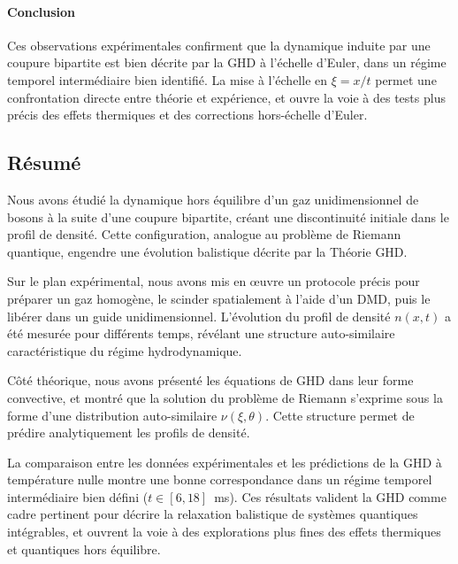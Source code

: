 {\color{blue}
\paragraph{Conclusion}

Ces observations expérimentales confirment que la dynamique induite par une coupure bipartite est bien décrite par la GHD à l’échelle d’Euler, dans un régime temporel intermédiaire bien identifié. La mise à l’échelle en $\xi=x/t$ permet une confrontation directe entre théorie et expérience, et ouvre la voie à des tests plus précis des effets thermiques et des corrections hors-échelle d’Euler.
}

\subsection*{Résumé}

Nous avons étudié la dynamique hors équilibre d’un gaz unidimensionnel de bosons à la suite d’une coupure bipartite, créant une discontinuité initiale dans le profil de densité. Cette configuration, analogue au problème de Riemann quantique, engendre une évolution balistique décrite par la Théorie \gls*{GHD}.

\medskip

Sur le plan expérimental, nous avons mis en œuvre un protocole précis pour préparer un gaz homogène, le scinder spatialement à l’aide d’un \gls{DMD}, puis le libérer dans un guide unidimensionnel. L’évolution du profil de densité $n(x,t)$ a été mesurée pour différents temps, révélant une structure auto-similaire caractéristique du régime hydrodynamique.

\medskip

Côté théorique, nous avons présenté les équations de GHD dans leur forme convective, et montré que la solution du problème de Riemann s’exprime sous la forme d’une distribution auto-similaire $\nu(\xi, \theta)$. Cette structure permet de prédire analytiquement les profils de densité.
\medskip

La comparaison entre les données expérimentales et les prédictions de la \gls*{GHD} à température nulle montre une bonne correspondance dans un régime temporel intermédiaire bien défini ($t \in [6,18]$~ms). Ces résultats valident la \gls*{GHD} comme cadre pertinent pour décrire la relaxation balistique de systèmes quantiques intégrables, et ouvrent la voie à des explorations plus fines des effets thermiques et quantiques hors équilibre.



